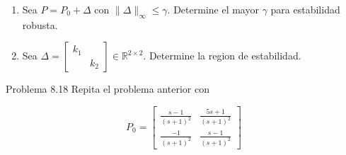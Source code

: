 \begin{enumerate}
  \item Sea $P=P_{0}+\Delta$ con $\|\Delta\|_{\infty} \leq \gamma$. Determine el mayor $\gamma$ para estabilidad robusta.
  \item Sea $\Delta=\left[\begin{array}{ll}k_{1} & \\ & k_{2}\end{array}\right] \in \mathbb{R}^{2 \times 2}$. Determine la region de estabilidad.
\end{enumerate}

Problema 8.18 Repita el problema anterior con

$$
P_{0}=\left[\begin{array}{cc}
\frac{s-1}{(s+1)^{2}} & \frac{5 s+1}{(s+1)^{2}} \\
\frac{-1}{(s+1)^{2}} & \frac{s-1}{(s+1)^{2}}
\end{array}\right]
$$



